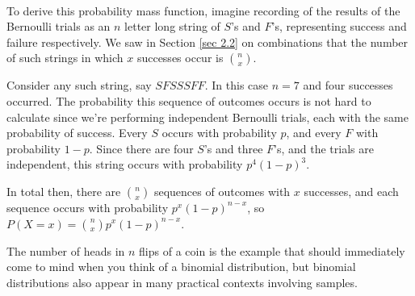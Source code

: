 \begin{center}
 \ \ \  
\end{center}

\par
To derive this probability mass function, imagine recording of the results of the Bernoulli trials as an $n$ letter long string of $S$'s and $F$'s, representing success and failure respectively. We saw in Section \ref{sec 2.2} on combinations that the number of such strings in which $x$ successes occur is $\binom{n}{x}$.
\par
Consider any such string, say $SFSSSFF$. In this case $n=7$ and four successes occurred. The probability this sequence of outcomes occurs is not hard to calculate since we're performing independent Bernoulli trials, each with the same probability of success. Every $S$ occurs with probability $p$, and every $F$ with probability $1-p$. Since there are four $S$'s and three $F$'s, and the trials are independent, this string occurs with probability $p^4(1-p)^3$.
\par
In total then, there are $\binom{n}{x}$ sequences of outcomes with $x$ successes, and each sequence occurs with probability $p^x(1-p)^{n-x}$, so $P(X = x) = \binom{n}{x}p^x(1-p)^{n-x}$.
\par
The number of heads in $n$ flips of a coin is the example that should immediately come to mind when you think of a binomial distribution, but binomial distributions also appear in many practical contexts involving samples.

